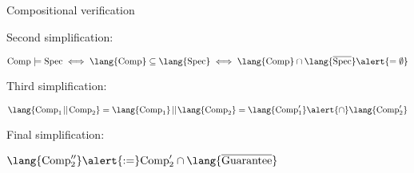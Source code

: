 \documentclass[../talk.tex]{subfiles}
\begin{document}
\begin{frame}{Compositional verification}
\begin{overlayarea}{\slidewidth}{\slideheight}
{            Second simplification:

            \(
                \text{Comp} \models \text{Spec}
                \iff
                \lang{\text{Comp}} \subseteq \lang{\text{Spec}}
                \iff
                \lang{\text{Comp}} \cap \lang{\overline{\text{Spec}}} \alert{= \emptyset}
            \)

            \vspace*{1em}


            {%

                Third simplification:

                \(
                    \lang{ \text{Comp}_1 \!\mid\mid\! \text{Comp}_2 }
                    =
                    \lang{ \text{Comp}_1 } \!\mid\mid\! \lang{ \text{Comp}_2 }
                    =
                    \lang{ \text{Comp}_1' } \alert{\cap} \lang{ \text{Comp}_2' }
                \)

                \vspace*{1em}
            }
            {%

                Final simplification:

                \(
                    \lang{ \text{Comp}_2'' }
                    \alert{:=} \text{Comp}_2' \cap \lang{\overline{\text{Guarantee}}}
                \)
            }
        }
    \end{overlayarea}
\end{frame}
\end{document}
